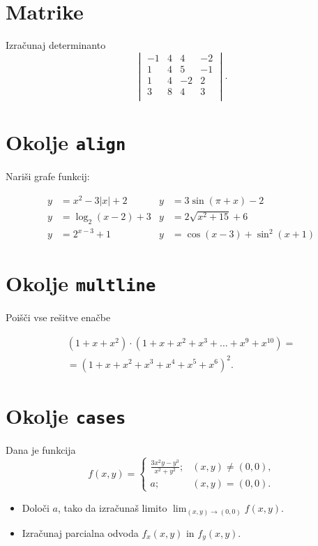 \documentclass[a4paper,12pt]{article}
\begin{document}
\section*{Matrike}
Izračunaj determinanto
$$
\begin{vmatrix}
    -1 & 4 & 4 & -2 \\
    1 & 4 & 5 & -1 \\
    1 & 4 & -2 & 2 \\
    3 & 8 & 4 & 3 \\
    \end{vmatrix}.
$$

\section*{Okolje \texttt{align}}
Nariši grafe funkcij:

\begin{align*}
y &= x^2 - 3|x| + 2    &y &= 3 \sin(\pi+x) - 2 \\
y &= \log_2(x-2) + 3   &y &= 2 \sqrt{x^2+15} + 6 \\
y &= 2^{x-3} + 1       &y &= \cos(x-3) + \sin^2(x+1)
\end{align*}


\section*{Okolje \texttt{multline}}
Poišči vse rešitve enačbe

\begin{multline*}
(1+x+x^2) \cdot (1+x+x^2+x^3+\ldots+x^9+x^{10}) = \\
 =(1+x+x^2+x^3+x^4+x^5+x^6)^2.
\end{multline*}

\section*{Okolje \texttt{cases}}
Dana je funkcija
$$ f(x,y)=
   \begin{cases}
   \frac{3x^2y-y^3}{x^2+y^2};  &(x,y)\neq(0,0) \text{,}\\
   a; &(x,y)= (0,0).
   \end{cases} 
$$
\begin{itemize}
\item Določi \(a\), tako da izračunaš limito \( \lim_{(x,y)\to(0,0)} f(x,y) \).
\item Izračunaj parcialna odvoda \(f_x(x,y)\) in \(f_y(x,y)\).
\end{itemize}
\end{document}
